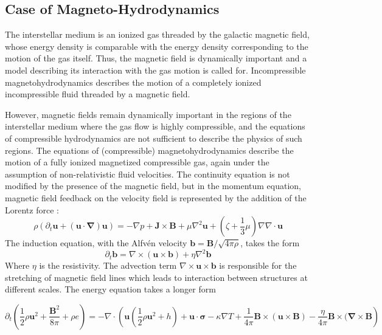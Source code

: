 \subsection{Case of Magneto-Hydrodynamics}
The interstellar medium is an ionized gas threaded by the galactic magnetic field, whose energy density is comparable with the energy density corresponding to the motion of the gas itself. Thus, the magnetic field is dynamically important and a model describing its interaction with the gas motion is called for. Incompressible magnetohydrodynamics describes the motion of a completely ionized incompressible fluid threaded by a magnetic field. 

However, magnetic fields remain dynamically important in the regions of the interstellar medium where the gas flow is highly compressible, and the equations of compressible hydrodynamics are not sufficient to describe the physics of such regions.
The equations of (compressible) magnetohydrodynamics describe the motion of a fully ionized magnetized compressible gas, again under the assumption of non-relativistic fluid velocities.
The continuity equation is not modified by the presence of the magnetic field, but in the momentum equation, magnetic field feedback on the velocity field is represented by the addition of the Lorentz force :
\begin{equation}
    \rho(\partial_t\mathbf{u}+(\mathbf{u}\cdot\boldsymbol{\nabla})\mathbf{u})=-\nabla p+\mathbf{J}\times\mathbf{B}+\mu\nabla^2\mathbf{u}+\left(\zeta+\frac{1}{3}\mu\right)\nabla\nabla\cdot\mathbf{u}
\end{equation}
The induction equation, with the Alfv\'en velocity $\mathbf{b}=\mathbf{B}/\sqrt{4\pi\rho}$, takes the form
\begin{equation}
    \partial_t\mathbf{b}=\nabla\times(\mathbf{u}\times\mathbf{b})+\eta\nabla^2\mathbf{b}
\end{equation}
Where $\eta$ is the resistivity. The advection term $\nabla\times\mathbf{u}\times\mathbf{b}$ is responsible for the stretching of magnetic field lines which leads to interaction between structures at different scales.
The energy equation takes a longer form
\begin{fullwidth}
\begin{equation}
    \partial_t\left(\frac{1}{2}\rho\mathbf{u}^2+\frac{\mathbf{B}^2}{8\pi}+\rho e\right)=-\nabla\cdot\left(\mathbf{u}\left(\frac{1}{2}\rho\mathbf{u}^2+h\right)+\mathbf{u}\cdot\boldsymbol{\sigma}-\kappa\nabla T+\frac{1}{4\pi}\mathbf{B}\times(\mathbf{u}\times\mathbf{B})-\frac{\eta}{4\pi}\mathbf{B}\times(\boldsymbol{\nabla}\times\mathbf{B}\right)
\end{equation}
\end{fullwidth}
